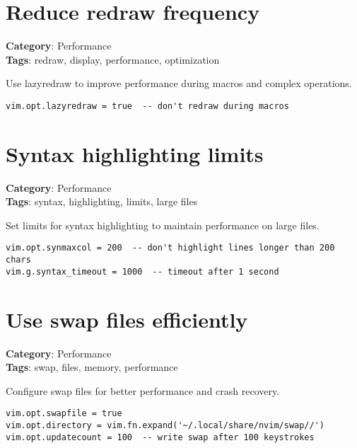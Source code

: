 {{{{{{{{{{\section{Reduce redraw frequency}

\textbf{Category}: Performance\\ \textbf{Tags}: redraw, display, performance, optimization
\vspace{0.5cm}

Use lazyredraw to improve performance during macros and complex operations.

\begin{Exa*}{}
\begin{Verbatim}[fontsize=\footnotesize, breaklines, breakanywhere]
vim.opt.lazyredraw = true  -- don't redraw during macros
\end{Verbatim}
\end{Exa*}

\section{Syntax highlighting limits}

\textbf{Category}: Performance\\ \textbf{Tags}: syntax, highlighting, limits, large files
\vspace{0.5cm}

Set limits for syntax highlighting to maintain performance on large files.

\begin{Exa*}{}
\begin{Verbatim}[fontsize=\footnotesize, breaklines, breakanywhere]
vim.opt.synmaxcol = 200  -- don't highlight lines longer than 200 chars
vim.g.syntax_timeout = 1000  -- timeout after 1 second
\end{Verbatim}
\end{Exa*}

\section{Use swap files efficiently}

\textbf{Category}: Performance\\ \textbf{Tags}: swap, files, memory, performance
\vspace{0.5cm}

Configure swap files for better performance and crash recovery.

\begin{Exa*}{}
\begin{Verbatim}[fontsize=\footnotesize, breaklines, breakanywhere]
vim.opt.swapfile = true
vim.opt.directory = vim.fn.expand('~/.local/share/nvim/swap//')
vim.opt.updatecount = 100  -- write swap after 100 keystrokes
\end{Verbatim}
\end{Exa*}

}}}}}}}}}}
